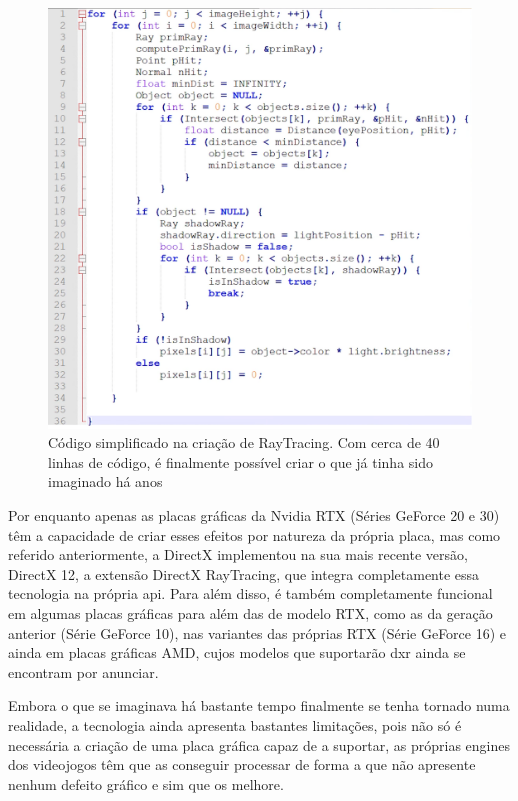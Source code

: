 \documentclass{report}
\begin{document}
\begin{figure}[h]
\centering
\includegraphics[width=1.4\textwidth]{codigo_raytracing.png}
\caption{Código simplificado na criação de RayTracing. Com cerca de 40 linhas de código, é finalmente possível criar o que já tinha sido imaginado há anos}
\label{fig:codigo_rt}
\end{figure}
\clearpage

\vspace{5mm} Por enquanto apenas as placas gráficas da Nvidia RTX (Séries GeForce 20 e 30) têm a capacidade de criar esses efeitos por natureza da própria placa, mas como referido anteriormente, a DirectX implementou na sua mais recente versão, DirectX 12, a extensão DirectX RayTracing, que integra completamente essa tecnologia na própria \acs{api}. Para além disso, é também completamente funcional em algumas placas gráficas para além das de modelo RTX, como as da geração anterior (Série GeForce 10), nas variantes das próprias RTX (Série GeForce 16) e ainda em placas gráficas AMD, cujos modelos que suportarão \ac{dxr} ainda se encontram por anunciar. \cite{directx}

\vspace{5mm} Embora o que se imaginava há bastante tempo finalmente se tenha tornado numa realidade, a tecnologia ainda apresenta bastantes limitações, pois não só é necessária a criação de uma placa gráfica capaz de a suportar, as próprias engines dos videojogos têm que as conseguir processar de forma a que não apresente nenhum defeito gráfico e sim que os melhore.
\end{document}
